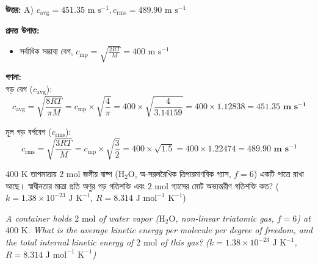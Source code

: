 \documentclass[12pt, a4paper]{article}
\begin{document}
\vspace{0.5em}
\begin{tcolorbox}[answerbox]
    \textbf{\color{success} উত্তর:} A) $c_{\text{avg}} = 451.35\text{ m s}^{-1}, c_{\text{rms}} = 489.90\text{ m s}^{-1}$
\end{tcolorbox}
\vspace{1em}

\begin{tcolorbox}[solutionbox={সমাধান (Solution)}]
    \noindent
    \textbf{প্রদত্ত উপাত্ত:}
    \begin{itemize}[leftmargin=1.5em, itemsep=0.2em]
        \item সর্বাধিক সম্ভাব্য বেগ, $c_{\text{mp}} = \sqrt{\frac{2 R T}{M}} = 400\text{ m s}^{-1}$
    \end{itemize}

    \vspace{0.6em}
    \noindent\textbf{গণনা:} \\
    গড় বেগ ($c_{\text{avg}}$):
    \[ c_{\text{avg}} = \sqrt{\frac{8 R T}{\pi M}} = c_{\text{mp}} \times \sqrt{\frac{4}{\pi}} = 400 \times \sqrt{\frac{4}{3.14159}} = 400 \times 1.12838 = \mathbf{451.35\text{ m s}^{-1}} \]
    
    মূল গড় বর্গবেগ ($c_{\text{rms}}$):
    \[ c_{\text{rms}} = \sqrt{\frac{3 R T}{M}} = c_{\text{mp}} \times \sqrt{\frac{3}{2}} = 400 \times \sqrt{1.5} = 400 \times 1.22474 = \mathbf{489.90\text{ m s}^{-1}} \]
\end{tcolorbox}


\begin{tcolorbox}[questionbox={প্রশ্ন (Question) 5}]
    \noindent
    $400\text{ K}$ তাপমাত্রায় $2\text{ mol}$ জলীয় বাষ্প ($\text{H}_2\text{O}$, অ-সরলরৈখিক ত্রিপারমাণবিক গ্যাস, $f = 6$) একটি পাত্রে রাখা আছে। স্বাধীনতার মাত্রা প্রতি অণুর গড় গতিশক্তি এবং $2\text{ mol}$ গ্যাসের মোট অভ্যন্তরীণ গতিশক্তি কত? ($k = 1.38 \times 10^{-23}\text{ J K}^{-1}$, $R = 8.314\text{ J mol}^{-1}\text{ K}^{-1}$)
    
    \vspace{0.8em}
    \begin{english}
    \noindent\textit{\color{darkgray}
    A container holds $2\text{ mol}$ of water vapor ($\text{H}_2\text{O}$, non-linear triatomic gas, $f = 6$) at $400\text{ K}$. What is the average kinetic energy per molecule per degree of freedom, and the total internal kinetic energy of $2\text{ mol}$ of this gas? ($k = 1.38 \times 10^{-23}\text{ J K}^{-1}$, $R = 8.314\text{ J mol}^{-1}\text{ K}^{-1}$)
    }
    \end{english}
\end{tcolorbox}
\end{document}
